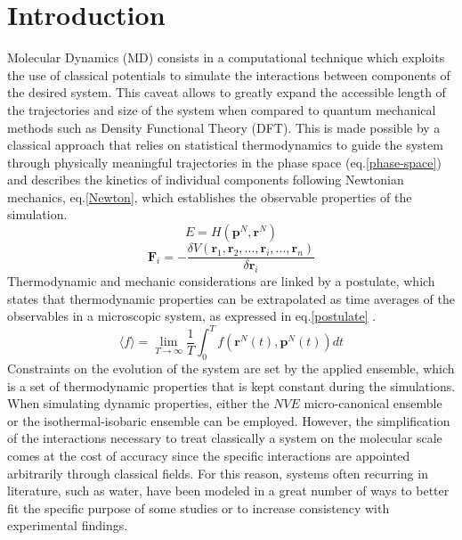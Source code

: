 \documentclass[
	12pt, %
]{fphw}
\begin{document}
\section{Introduction}
Molecular Dynamics (MD) consists in a computational technique which exploits the use of classical potentials to simulate the interactions between components of the desired system.
This caveat allows to greatly expand the accessible length of the trajectories and size of the system when compared to quantum mechanical methods such as Density Functional Theory (DFT).
This is made possible by a classical approach that relies on statistical thermodynamics to guide the system through physically meaningful trajectories in the phase space (eq.\ref{phase-space}) and describes the kinetics of individual components following Newtonian mechanics, eq.\ref{Newton}, which establishes the observable properties of the simulation.
\begin{equation}
	E = H (\textbf{p}^{N}, \textbf{r}^{N})
	\label{phase-space}
\end{equation}
\begin{equation}
	\textbf{F}_{i} = -\frac{\delta V(\textbf{r}_{1}, \textbf{r}_{2},..., \textbf{r}_{i},..., \textbf{r}_{n})}{\delta \textbf{r}_{i}}
	\label{Newton}
\end{equation}
Thermodynamic and mechanic considerations are linked by a postulate, which states that thermodynamic properties can be extrapolated as time averages of the observables in a microscopic system, as expressed in eq.\ref{postulate} .
\begin{equation}
	\langle f\rangle = \lim\limits_{T \to \infty} \frac{1}{T} \int_{0}^{T} f(\textbf{r}^{N}(t),\textbf{p}^{N}(t)) dt 
	\label{postulate}
\end{equation}
Constraints on the evolution of the system are set by the applied ensemble, which is a set of thermodynamic properties that is kept constant during the simulations.
When simulating dynamic properties, either the $NVE$ micro-canonical ensemble or the isothermal-isobaric ensemble can be employed.
However, the simplification of the interactions necessary to treat classically a system on the molecular scale comes at the cost of accuracy since the specific interactions are appointed arbitrarily through classical fields.
For this reason, systems often recurring in literature, such as water, have been modeled in a great number of ways to better fit the specific purpose of some studies or to increase consistency with experimental findings.
\end{document}
